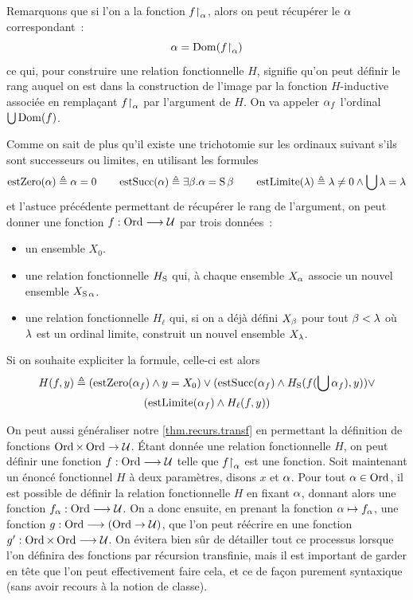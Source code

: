 Remarquons que si l'on a la fonction $f\mathbin{\upharpoonright}_{\alpha}$, alors on peut récupérer
le $\alpha$ correspondant~:
\[\alpha = \operatorname{Dom}(f\mathbin{\upharpoonright}_{\alpha})\]
ce qui, pour construire une relation fonctionnelle $H$, signifie qu'on peut
définir le rang auquel on est dans la construction de l'image par la fonction
$H$-inductive associée en remplaçant $f\mathbin{\upharpoonright}_{\alpha}$ par l'argument de $H$.
On va appeler $\alpha_{f}$ l'ordinal $\bigcup\operatorname{Dom}(f)$.

Comme on sait de plus qu'il existe une trichotomie sur les ordinaux suivant
s'ils sont successeurs ou limites, en utilisant les formules
\[\operatorname{estZero}(\alpha) \triangleq \alpha = 0\qquad
\operatorname{estSucc}(\alpha)\triangleq \exists \beta. \alpha = \operatorname{S}\beta \qquad
\operatorname{estLimite}(\lambda)\triangleq \lambda \neq 0 \land \bigcup \lambda = \lambda\]
et l'astuce précédente permettant de récupérer le rang de l'argument, on peut
donner une fonction $f : \displaystyle \operatorname{Ord} \longrightarrow \mathcal{U}$ par trois données~:
\begin{itemize}
\item un ensemble $X_0$.
\item une relation fonctionnelle $H_{\operatorname{S}}$ qui, à chaque ensemble
  $X_\alpha$ associe un nouvel ensemble $X_{\operatorname{S}\alpha}$.
\item une relation fonctionnelle $H_\ell$ qui, si on a déjà défini $X_\beta$ pour
  tout $\beta < \lambda$ où $\lambda$ est un ordinal limite, construit un nouvel
  ensemble $X_\lambda$.
\end{itemize}

Si on souhaite expliciter la formule, celle-ci est alors
\begin{multline*}
  H(f,y) \triangleq (\operatorname{estZero}(\alpha_{f})\land y = X_0)\lor
  (\operatorname{estSucc}(\alpha_{f})\land H_{\operatorname{S}}(f(\bigcup \alpha_{f}),y))\lor\\
  (\operatorname{estLimite}(\alpha_{f})\land H_\ell(f,y))
\end{multline*}

On peut aussi généraliser notre \cref{thm.recurs.transf} en permettant la
définition de fonctions $\operatorname{Ord}\times\operatorname{Ord}\to \mathcal{U}$. \'Etant donnée une
relation fonctionnelle $H$, on peut définir une fonction
$f : \displaystyle \operatorname{Ord} \longrightarrow \mathcal{U}$ telle que $f\mathbin{\upharpoonright}_{\alpha}$ est une fonction.
Soit maintenant un énoncé fonctionnel $H$ à deux paramètres, disons $x$ et
$\alpha$. Pour tout $\alpha\in\operatorname{Ord}$, il est possible de définir la relation
fonctionnelle $H$ en fixant $\alpha$, donnant alors une fonction
$f_{\alpha} : \displaystyle \operatorname{Ord} \longrightarrow \mathcal{U}$. On a donc ensuite, en prenant la
fonction $\alpha \mapsto f_{\alpha}$, une fonction
$g : \displaystyle \operatorname{Ord} \longrightarrow (\operatorname{Ord}\to\mathcal{U})$, que l'on peut réécrire en une fonction
$g' : \displaystyle \operatorname{Ord}\times\operatorname{Ord} \longrightarrow \mathcal{U}$. On évitera bien sûr de détailler tout
ce processus lorsque l'on définira des fonctions par récursion transfinie, mais
il est important de garder en tête que l'on peut effectivement faire cela, et ce
de façon purement syntaxique (sans avoir recours à la notion de classe).

